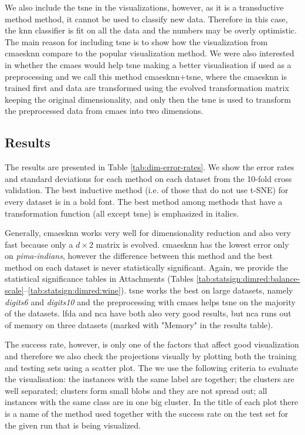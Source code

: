 \documentclass[12pt,a4paper]{report}
\begin{document}
We also include the \ac{tsne} in the visualizations, however, as it is a transductive method method, it cannot be used to classify new data. Therefore in this case, the \ac{knn} classifier is fit on all the data and the numbers may be overly optimistic. The main reason for including \ac{tsne} is to show how the visualization from \ac{cmaesknn} compare to the popular visualization method. We were also interested in whether the \ac{cmaes} would help \ac{tsne} making a better visualisation if used as a preprocessing and we call this method \ac{cmaesknn}+\ac{tsne}, where the \ac{cmaesknn} is trained first and data are transformed using the evolved transformation matrix keeping the original dimensionality, and only then the \ac{tsne} is used to transform the preprocessed data from \ac{cmaes} into two dimensions.

\subsection{Results}

The results are presented in Table \ref{tab:dim-error-rates}. We show the error rates and standard deviations for each method on each dataset from the 10-fold cross validation. The best inductive method (i.e. of those that do not use t-SNE) for every dataset is in a bold font. The best method among methods that have a transformation function (all except \ac{tsne}) is emphasized in italics.

Generally, \ac{cmaesknn} works very well for dimensionality reduction and also very fast because only a $d\times2$ matrix is evolved. \ac{cmaesknn} has the lowest error only on \textit{pima-indians}, however the difference between this method and the best method on each dataset is never statistically significant. Again, we provide the statistical significance tables in Attachments (Tables \ref{tab:statsign:dimred:balance-scale}--\ref{tab:statsign:dimred:wine}). \ac{tsne} works the best on large datasets, namely \textit{digits6} and \textit{digits10} and the preprocessing with \ac{cmaes} helps \ac{tsne} on the majority of the datasets. \ac{lfda} and \ac{nca} have both also very good results, but \ac{nca} runs out of memory on three datasets (marked with "Memory" in the results table).



The success rate, however, is only one of the factors that affect good visualization and therefore we also check the projections visually by plotting both the training and testing sets using a scatter plot. The we use the following criteria to evaluate the visualisation: the instances with the same label are together; the clusters are well separated; clusters form small blobs and they are not spread out; all instances with the same class are in one big cluster. In the title of each plot there is a name of the method used together with the success rate on the test set for the given run that is being visualized.
\end{document}
